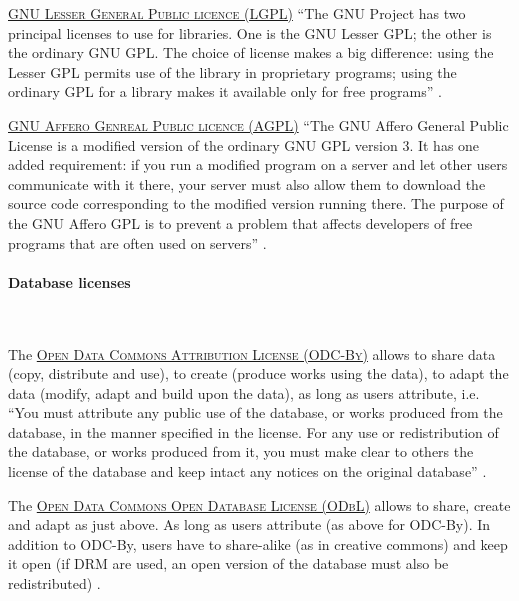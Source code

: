 \vspace{0.4cm}

\noindent {} \textsc{\href{http://www.gnu.org/licenses/lgpl.html}{GNU Lesser General Public licence (LGPL)}} ``The GNU Project has two principal licenses to use for libraries. One is the GNU Lesser GPL; the other is the ordinary GNU GPL. The choice of license makes a big difference: using the Lesser GPL permits use of the library in proprietary programs; using the ordinary GPL for a library makes it available only for free programs'' \cite{fsf_lgpl_2015}.

\vspace{0.4cm}

\noindent {} \textsc{\href{http://www.gnu.org/licenses/agpl.html}{GNU Affero Genreal Public licence (AGPL)}} ``The GNU Affero General Public License is a modified version of the ordinary GNU GPL version 3. It has one added requirement: if you run a modified program on a server and let other users communicate with it there, your server must also allow them to download the source code corresponding to the modified version running there. The purpose of the GNU Affero GPL is to prevent a problem that affects developers of free programs that are often used on servers'' \cite{fsf_agpl_2015}.

\paragraph{Database licenses}

~

\noindent {} The \textsc{\href{http://opendatacommons.org/licenses/by/}{Open Data Commons Attribution License (ODC-By)}} allows to share data (copy, distribute and use), to create (produce works using the data), to adapt the data (modify, adapt and build upon the data), as long as users attribute, i.e. ``You must attribute any public use of the database, or works produced from the database, in the manner specified in the license. For any use or redistribution of the database, or works produced from it, you must make clear to others the license of the database and keep intact any notices on the original database''  \cite{opendatacommons_odc-by_2015}.

\vspace{0.4cm}

\noindent {} The \textsc{\href{http://opendatacommons.org/licenses/odbl/summary/}{Open Data Commons Open Database License (ODbL)}} allows to share, create and adapt as just above. As long as users attribute (as above for ODC-By). In addition to ODC-By, users have to share-alike (as in creative commons) and keep it open (if DRM are used, an open version of the database must also be redistributed) \cite{opendatacommons_odbl_2015}.

